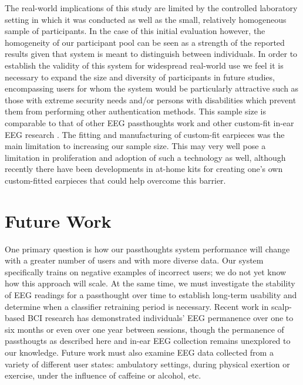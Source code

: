 \documentclass{sigchi}
\begin{document}
The real-world implications of this study are limited by the controlled laboratory setting in which it was conducted as well as the small, relatively homogeneous sample of participants. In the case of this initial evaluation however, the homogeneity of our participant pool can be seen as a strength of the reported results given that system is meant to distinguish between individuals. In order to establish the validity of this system for widespread real-world use we feel it is necessary to expand the size and diversity of participants in future studies, encompassing users for whom the system would be particularly attractive such as those with extreme security needs and/or persons with disabilities which prevent them from performing other authentication methods. This sample size is comparable to that of other EEG passthoughts work \cite{Ashby2011, Marcel2007a, Poulos2002, Chuang2013b, curran2016passthoughts} and other custom-fit in-ear EEG research \cite{Kidmose2013a, Mikkelsen2015}. The fitting and manufacturing of custom-fit earpieces was the main limitation to increasing our sample size. This may very well pose a limitation in proliferation and adoption of such a technology as well, although recently there have been developments in at-home kits for creating one's own custom-fitted earpieces \cite{voix2015settable} that could help overcome this barrier.

\section{Future Work}

One primary question is how our passthoughts system performance will change with a greater number of users and with more diverse data. Our system specifically trains on negative examples of incorrect users; we do not yet know how this approach will scale. At the same time, we must investigate the stability of EEG readings for a passthought over time to establish long-term usability and determine when a classifier retraining period is necessary. Recent work in scalp-based BCI research has demonstrated individuals' EEG permanence over one to six months \cite{Maiorana2016, Armstrong2015} or even over one year \cite{Ruiz2017} between sessions, though the permanence of passthougts as described here and in-ear EEG collection remains unexplored to our knowledge. Future work must also examine EEG data collected from a variety of different user states: ambulatory settings, during physical exertion or exercise, under the influence of caffeine or alcohol, etc.
\end{document}
